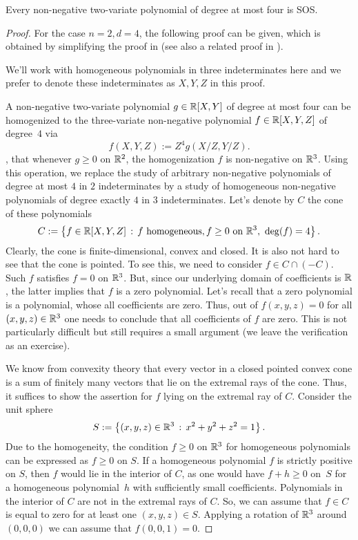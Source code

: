 \begin{theorem}[Hilbert]
	\label{thm:ternary:quartics}
	Every non-negative two-variate polynomial of degree at most four is SOS. 
\end{theorem}
\begin{proof}
	For the case $n=2, d=4$, the following proof can be given, which is obtained by simplifying the proof in \cite{Pfister:Scheiderer:2012} (see also a related proof in \cite[Prop.~6.3.4]{Bochnak:Coste:Roy:1998}). 
	
	We'll work with homogeneous polynomials in three indeterminates here and we prefer to denote these indeterminates as $X, Y, Z$ in this proof. 
	
	A non-negative two-variate polynomial $g \in \mathbb{R}[X,Y]$ of degree at most four can be homogenized to the three-variate non-negative polynomial $f \in \mathbb{R}[X,Y,Z]$ of degree~$4$ via
	\[
		f(X,Y,Z) := Z^4 g(X/Z,Y/Z).
	\]
, that whenever $g \ge 0$ on $\mathbb{R}^2$, the homogenization $f$ is non-negative on $\mathbb{R}^3$. Using this operation, we replace the study of arbitrary non-negative polynomials of degree at most $4$ in $2$ indeterminates by a study of homogeneous non-negative polynomials of degree exactly $4$ in $3$ indeterminates. Let's denote by $C$ the cone of these polynomials 
	\[
		C:= \setcond{ f \in \R[X,Y,Z]}{f \ \text{homogeneous}, f \ge 0 \ \text{on} \ \R^3, \ \deg(f) = 4}.
	\]
	Clearly, the cone is finite-dimensional, convex and closed. It is also not hard to see that the cone is pointed. To see this, we need to consider $f \in C \cap (-C)$. Such $f$ satisfies $f=0$ on $\mathbb{R}^3$. But, since our underlying domain of coefficients is $\mathbb{R}$,  the latter implies that $f$ is a zero polynomial. Let's recall that a zero polynomial is a polynomial, whose all coefficients are zero. Thus, out of $f(x,y,z) =0$ for all $(x,y,z) \in \mathbb{R}^3$ one needs to conclude that all coefficients of $f$ are zero. This is not particularly difficult but still requires a small argument (we leave the verification as an exercise). 
	
	We know from convexity theory that every vector in a closed pointed convex cone is a sum of finitely many vectors that lie on the extremal rays of the cone. Thus, it suffices to show the assertion for $f$ lying on the extremal ray of $C$.	Consider the unit sphere 
	\[
		S := \left\{ (x,y,z) \in \mathbb{R}^3 \,:\, x^2 + y^2 + z^2 = 1 \right\}.
	\]
	Due to the homogeneity, the condition $f \ge 0$ on $\mathbb{R}^3$ for homogeneous polynomials can be expressed as $f \ge 0$ on $S$. If a homogeneous polynomial $f$ is strictly positive on $S$, then $f$ would lie in the interior of $C$, as one would have $f+ h \ge 0$ on~$S$ for a homogeneous polynomial~$h$ with sufficiently small coefficients. Polynomials in the interior of $C$ are not  in the extremal rays of $C$. So, we can assume that $f \in C$ is equal to zero for at least one $(x,y,z) \in S$. Applying a rotation of $\mathbb{R}^3$ around $(0,0,0)$ we can assume that $f(0,0,1) = 0$. 
	

\end{proof}
